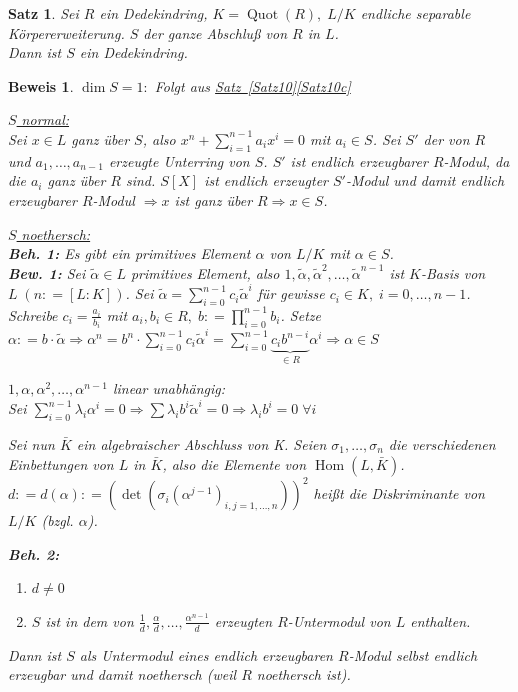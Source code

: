 \documentclass[a4paper,12pt]{scrbook}
\theoremstyle{break}
\newtheorem{Satz}{Satz}
\theoremstyle{nonumberbreak}
\newtheorem{Bew}{Beweis}
\theoremstyle{nonumberplain}
\newcommand{\defeqr}[0]{\mathrel{\mathop:}=}
\DeclareMathOperator{\Hom}{Hom}
\DeclareMathOperator{\Quot}{Quot}
\begin{document}
\begin{Satz} 
Sei $R$ ein Dedekindring, $K = \Quot(R), \; L/K$ endliche separable
Körpererweiterung.
$S$ der ganze Abschluß von $R$ in $L$.\\
Dann ist $S$ ein Dedekindring.
\end{Satz}

\begin{Bew} 
\underline{$\dim S=1:$} Folgt aus \hyperref[Satz10]{Satz~\ref*{Satz10}\ref*{Satz10c}}

\underline{$S$ normal:}\\
Sei $x\in L$ ganz über $S$, also $x^n+\sum_{i=1}^{n-1}a_i x^i = 0$ mit $a_i \in S$.
Sei $S'$ der von $R$ und $a_1,\dots,a_{n-1}$ erzeugte Unterring von $S$.
$S'$ ist endlich erzeugbarer $R$-Modul, da die $a_i$ ganz über $R$ sind.
$S[X]$ ist endlich erzeugter $S'$-Modul und damit endlich erzeugbarer $R$-Modul $\Rightarrow x$ ist ganz über $R \Rightarrow x \in S$.

\underline{$S$ noethersch:}\\
\textbf{Beh. 1:} Es gibt ein primitives Element $\alpha$ von $L/K$ mit $\alpha \in S$.\\
\textbf{Bew. 1:} Sei $\tilde{\alpha} \in L$ primitives Element, also $1, \tilde{\alpha}, \tilde{\alpha}^2, \dots, \tilde{\alpha}^{n-1}$ ist $K$-Basis von $L \; (n \defeqr [L:K])$.
Sei $\tilde{\alpha} = \sum_{i=0}^{n-1} c_i \tilde{\alpha}^i$ für gewisse $c_i \in K, \; i = 0, \dots, n-1$.
Schreibe $c_i = \frac{a_i}{b_i}$ mit $a_i, b_i \in R, \; b \defeqr \prod_{i=0}^{n-1} b_i$.
Setze $\alpha \defeqr b \cdot \tilde{\alpha} \Rightarrow \alpha^n = b^n \cdot
\sum_{i=0}^{n-1} c_i \tilde{\alpha}^i = \sum_{i=0}^{n-1} \underset{\in
R}{\underbrace{c_i b^{n-i}}}\alpha^i \Rightarrow \alpha \in S$

$1, \alpha, \alpha^2, \dots, \alpha^{n-1}$ linear unabhängig:\\
Sei $\sum_{i=0}^{n-1} \lambda_i \alpha^i = 0 \Rightarrow \sum \lambda_i b^i \tilde{\alpha}^i = 0 \Rightarrow \lambda_i b^i = 0 \; \forall i$

Sei nun $\bar{K}$ ein algebraischer Abschluss von K.
Seien $\sigma_1, \dots, \sigma_n$ die verschiedenen Einbettungen von $L$ in
$\bar{K}$, also die Elemente von $\Hom(L,\bar{K})$.\\
$d \defeqr d(\alpha) \defeqr (\det(\sigma_i(\alpha^{j-1})_{i,j=1, \dots, n}))^2$
heißt die Diskriminante von $L/K$ (bzgl. $\alpha$).

\textbf{Beh. 2:}
\vspace{-1.5ex}
\begin{enumerate} 
  \item $d \not= 0$
  \item $S$ ist in dem von $\frac{1}{d}, \frac{\alpha}{d}, \dots,
  \frac{\alpha^{n-1}}{d}$ erzeugten $R$-Untermodul von $L$ enthalten.
\end{enumerate}
Dann ist $S$ als Untermodul eines endlich erzeugbaren $R$-Modul selbst endlich
erzeugbar und damit noethersch (weil $R$ noethersch ist).


\end{Bew}
\end{document}

